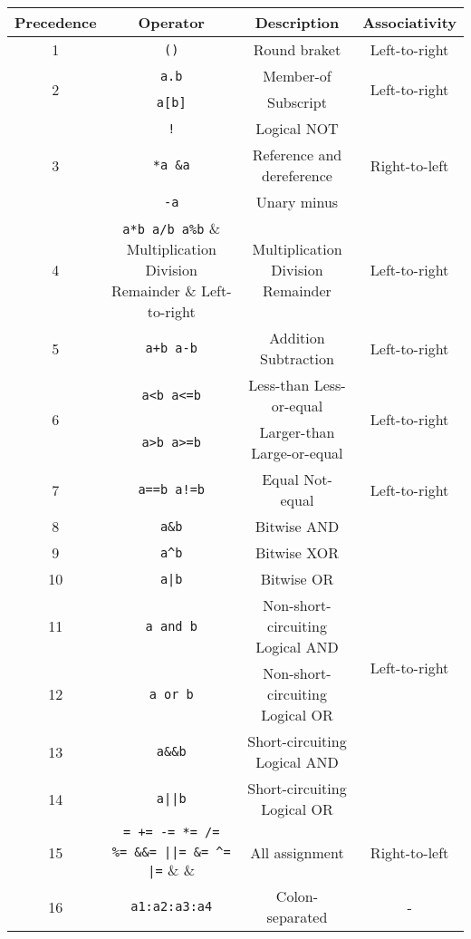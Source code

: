 \documentclass{article}
\begin{document}
\begin{table}[H]
	\centering
	\begin{tabular}{|c|c|c|c|}
		\hline
		Precedence & Operator & Description & Associativity \\\hline
		1 & \verb|()| & Round braket & Left-to-right \\\hline
		\multirow{2}{*}{2} & \verb|a.b| & Member-of & \multirow{2}{*}{Left-to-right} \\\cline{2-3}
		& \verb|a[b]| & Subscript & \\\hline
		\multirow{3}{*}{3} & \verb|!| & Logical NOT & \multirow{3}{*}{Right-to-left}\\\cline{2-3}
		& \verb|*a &a| & Reference and dereference & \\\cline{2-3}
		& \verb|-a| & Unary minus & \\\hline
		4 & \verb|a*b a/b a%b| & Multiplication Division Remainder & Left-to-right \\\hline
		5 & \verb|a+b a-b| & Addition Subtraction & Left-to-right \\\hline
		\multirow{2}{*}{6} & \verb|a<b a<=b| & Less-than Less-or-equal & \multirow{2}{*}{Left-to-right} \\\cline{2-3}
		& \verb|a>b a>=b| & Larger-than Large-or-equal & \\\hline
		7 & \verb|a==b a!=b| & Equal Not-equal & Left-to-right \\\hline
		8 & \verb|a&b| & Bitwise AND & \multirow{7}{*}{Left-to-right} \\\cline{1-3}
		9 & \verb|a^b| & Bitwise XOR & \\\cline{1-3}
		10 & \verb&a|b& & Bitwise OR & \\\cline{1-3}
		11 & \verb|a and b| & Non-short-circuiting Logical AND & \\\cline{1-3}
		12 & \verb|a or b| & Non-short-circuiting Logical OR & \\\cline{1-3}
		13 & \verb|a&&b| & Short-circuiting Logical AND & \\\cline{1-3}
		14 & \verb&a||b& & Short-circuiting Logical OR & \\\hline
		\multirow{2}{*}{15} & \verb|= += -= *= /=| & \multirow{2}{*}{All assignment} & \multirow{2}{*}{Right-to-left} \\\cline{2-2}
		& \verb"%= &&= ||= &= ^= |=" &  & \\\hline
		16 & \verb|a1:a2:a3:a4| & Colon-separated & - \\\hline
	\end{tabular}
\end{table}
\end{document}
